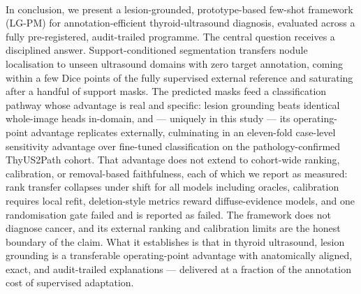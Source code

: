 \documentclass[jimh,article,submit,moreauthors,pdftex]{Definitions/tsp}
\begin{document}
\paragraph{}\noindent In conclusion, we present a lesion-grounded,
prototype-based few-shot framework
(LG-PM) for annotation-efficient thyroid-ultrasound diagnosis, evaluated
across a fully pre-registered, audit-trailed programme. The central
question receives a disciplined answer. Support-conditioned segmentation
transfers nodule localisation to unseen ultrasound domains with zero
target annotation, coming within a few Dice points of the fully
supervised external reference and saturating after a handful of support
masks. The predicted masks feed a classification pathway whose advantage
is real and specific: lesion grounding beats identical whole-image heads
in-domain, and --- uniquely in this study --- its operating-point
advantage replicates externally, culminating in an eleven-fold case-level
sensitivity advantage over fine-tuned classification on the
pathology-confirmed ThyUS2Path cohort. That advantage does not extend to
cohort-wide ranking, calibration, or removal-based faithfulness, each of
which we report as measured: rank transfer collapses under shift for all
models including oracles, calibration requires local refit, deletion-style
metrics reward diffuse-evidence models, and one randomisation gate failed
and is reported as failed. The framework does not diagnose cancer, and its
external ranking and calibration limits are the honest boundary of the
claim. What it establishes is that in thyroid ultrasound, lesion grounding
is a transferable operating-point advantage with anatomically aligned,
exact, and audit-trailed explanations --- delivered at a fraction of the
annotation cost of supervised adaptation.






\end{document}
